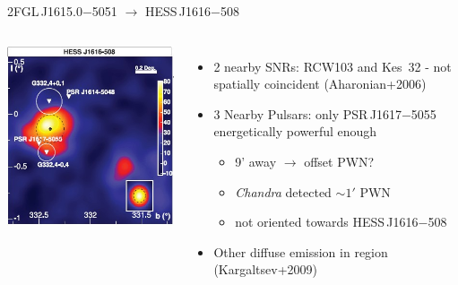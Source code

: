 \documentclass[12pt]{beamer}
\begin{document}
\begin{frame}{2FGL\,J1615.0$-$5051 $\rightarrow$ HESS\,J1616$-$508}
  \begin{columns}
  \includegraphics[scale=0.45]{plots/Som_1_07_p1.jpg}
  \begin{itemize}
    \item 2 nearby SNRs: RCW103 and Kes~32 - not spatially coincident (Aharonian+2006) 
    \item 3 Nearby Pulsars: only 
      PSR\,J1617$-$5055 energetically powerful enough
      \begin{itemize}
        \item 9' away $\rightarrow$ offset PWN?
        \item {\em Chandra} detected $\sim 1'$ PWN 
        \item not oriented towards HESS\,J1616$-$508
        \end{itemize}
      \item Other diffuse emission in region (Kargaltsev+2009)
    \end{itemize}
  \end{columns}
\end{frame}
\end{document}
